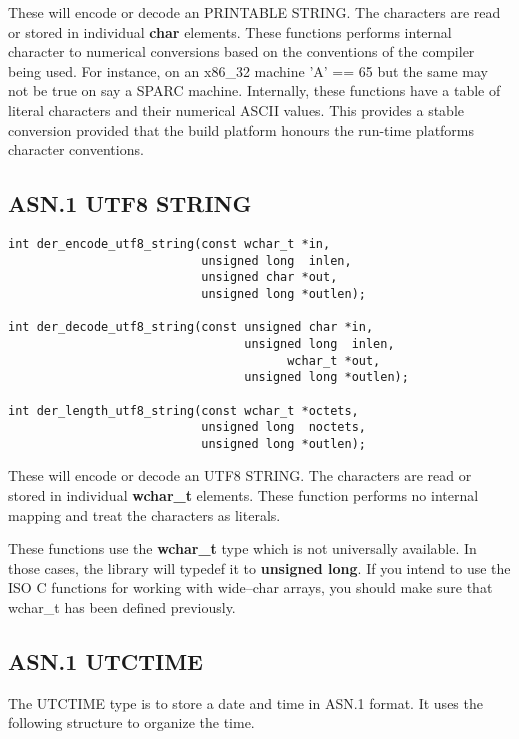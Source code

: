 \documentclass[synpaper]{book}
\begin{document}
These will encode or decode an PRINTABLE STRING.  The characters are read or stored in individual \textbf{char} elements.  These functions performs internal character
to numerical conversions based on the conventions of the compiler being used.  For instance, on an x86\_32 machine 'A' == 65 but the same may not be true on
say a SPARC machine.  Internally, these functions have a table of literal characters and their numerical ASCII values.  This provides a stable conversion provided
that the build platform honours the run-time platforms character conventions.

\subsection{ASN.1 UTF8 STRING}

\begin{verbatim}
int der_encode_utf8_string(const wchar_t *in,
                           unsigned long  inlen,
                           unsigned char *out,
                           unsigned long *outlen);

int der_decode_utf8_string(const unsigned char *in,
                                 unsigned long  inlen,
                                       wchar_t *out,
                                 unsigned long *outlen);

int der_length_utf8_string(const wchar_t *octets,
                           unsigned long  noctets,
                           unsigned long *outlen);
\end{verbatim}

These will encode or decode an UTF8 STRING.  The characters are read or stored in individual \textbf{wchar\_t} elements.  These function performs no internal
mapping and treat the characters as literals.

These functions use the \textbf{wchar\_t} type which is not universally available.  In those cases, the library will typedef it to \textbf{unsigned long}.  If you
intend to use the ISO C functions for working with wide--char arrays, you should make sure that wchar\_t has been defined previously.

\subsection{ASN.1 UTCTIME}

The UTCTIME type is to store a date and time in ASN.1 format.  It uses the following structure to organize the time.
\end{document}
